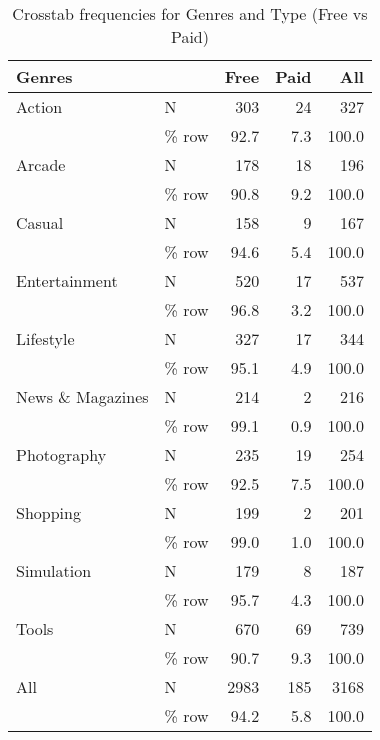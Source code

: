 \documentclass[
]{article}
\begin{document}
\begin{table}

\caption{\label{tab:unnamed-chunk-5}Crosstab frequencies for Genres and Type (Free vs Paid)}
\centering
\begin{tabular}[t]{llrrr}
\toprule
Genres &   & Free & Paid & All\\
\midrule
Action & N & 303 & 24 & 327\\
 & \% row & \num{92.7} & \num{7.3} & \num{100.0}\\
Arcade & N & 178 & 18 & 196\\
 & \% row & \num{90.8} & \num{9.2} & \num{100.0}\\
Casual & N & 158 & 9 & 167\\
 & \% row & \num{94.6} & \num{5.4} & \num{100.0}\\
Entertainment & N & 520 & 17 & 537\\
 & \% row & \num{96.8} & \num{3.2} & \num{100.0}\\
Lifestyle & N & 327 & 17 & 344\\
 & \% row & \num{95.1} & \num{4.9} & \num{100.0}\\
News \& Magazines & N & 214 & 2 & 216\\
 & \% row & \num{99.1} & \num{0.9} & \num{100.0}\\
Photography & N & 235 & 19 & 254\\
 & \% row & \num{92.5} & \num{7.5} & \num{100.0}\\
Shopping & N & 199 & 2 & 201\\
 & \% row & \num{99.0} & \num{1.0} & \num{100.0}\\
Simulation & N & 179 & 8 & 187\\
 & \% row & \num{95.7} & \num{4.3} & \num{100.0}\\
Tools & N & 670 & 69 & 739\\
 & \% row & \num{90.7} & \num{9.3} & \num{100.0}\\
All & N & 2983 & 185 & 3168\\
 & \% row & \num{94.2} & \num{5.8} & \num{100.0}\\
\bottomrule
\end{tabular}
\end{table}
\end{document}

